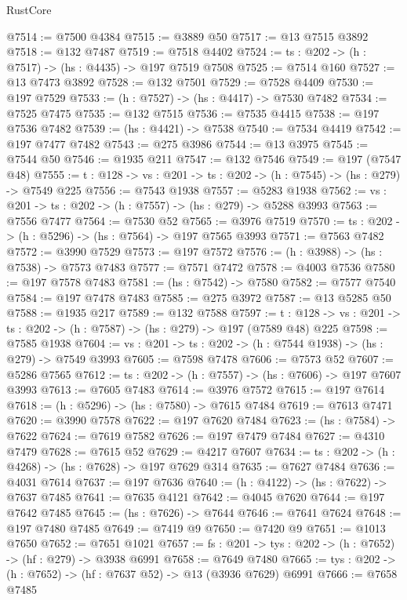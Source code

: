\begin{lexlean}{RustCore}
\begin{coremodule}
@7514 := @7500 @4384
@7515 := @3889 @50
@7517 := @13 @7515 @3892
@7518 := @132 @7487
@7519 := @7518 @4402
@7524 := {ts : @202} -> (h : @7517) -> (hs : @4435) -> @197 @7519 @7508
@7525 := @7514 @160
@7527 := @13 @7473 @3892
@7528 := @132 @7501
@7529 := @7528 @4409
@7530 := @197 @7529
@7533 := (h : @7527) -> (hs : @4417) -> @7530 @7482
@7534 := @7525 @7475
@7535 := @132 @7515
@7536 := @7535 @4415
@7538 := @197 @7536 @7482
@7539 := (hs : @4421) -> @7538
@7540 := @7534 @4419
@7542 := @197 @7477 @7482
@7543 := @275 @3986
@7544 := @13 @3975
@7545 := @7544 @50
@7546 := @1935 @211
@7547 := @132 @7546
@7549 := @197 (@7547 @48)
@7555 := {t : @128} -> {vs : @201} -> {ts : @202} -> (h : @7545) -> (hs : @279) -> @7549 @225
@7556 := @7543 @1938
@7557 := @5283 @1938
@7562 := {vs : @201} -> {ts : @202} -> (h : @7557) -> (hs : @279) -> @5288 @3993
@7563 := @7556 @7477
@7564 := @7530 @52
@7565 := @3976 @7519
@7570 := {ts : @202} -> (h : @5296) -> (hs : @7564) -> @197 @7565 @3993
@7571 := @7563 @7482
@7572 := @3990 @7529
@7573 := @197 @7572
@7576 := (h : @3988) -> (hs : @7538) -> @7573 @7483
@7577 := @7571 @7472
@7578 := @4003 @7536
@7580 := @197 @7578 @7483
@7581 := (hs : @7542) -> @7580
@7582 := @7577 @7540
@7584 := @197 @7478 @7483
@7585 := @275 @3972
@7587 := @13 @5285 @50
@7588 := @1935 @217
@7589 := @132 @7588
@7597 := {t : @128} ->
  {vs : @201} -> {ts : @202} -> (h : @7587) -> (hs : @279) -> @197 (@7589 @48) @225
@7598 := @7585 @1938
@7604 := {vs : @201} -> {ts : @202} -> (h : @7544 @1938) -> (hs : @279) -> @7549 @3993
@7605 := @7598 @7478
@7606 := @7573 @52
@7607 := @5286 @7565
@7612 := {ts : @202} -> (h : @7557) -> (hs : @7606) -> @197 @7607 @3993
@7613 := @7605 @7483
@7614 := @3976 @7572
@7615 := @197 @7614
@7618 := (h : @5296) -> (hs : @7580) -> @7615 @7484
@7619 := @7613 @7471
@7620 := @3990 @7578
@7622 := @197 @7620 @7484
@7623 := (hs : @7584) -> @7622
@7624 := @7619 @7582
@7626 := @197 @7479 @7484
@7627 := @4310 @7479
@7628 := @7615 @52
@7629 := @4217 @7607
@7634 := {ts : @202} -> (h : @4268) -> (hs : @7628) -> @197 @7629 @314
@7635 := @7627 @7484
@7636 := @4031 @7614
@7637 := @197 @7636
@7640 := (h : @4122) -> (hs : @7622) -> @7637 @7485
@7641 := @7635 @4121
@7642 := @4045 @7620
@7644 := @197 @7642 @7485
@7645 := (hs : @7626) -> @7644
@7646 := @7641 @7624
@7648 := @197 @7480 @7485
@7649 := @7419 @9
@7650 := @7420 @9
@7651 := @1013 @7650
@7652 := @7651 @1021
@7657 := {fs : @201} -> {tys : @202} -> (h : @7652) -> (hf : @279) -> @3938 @6991
@7658 := @7649 @7480
@7665 := {tys : @202} -> (h : @7652) -> (hf : @7637 @52) -> @13 (@3936 @7629) @6991
@7666 := @7658 @7485

\end{coremodule}
\end{lexlean}
